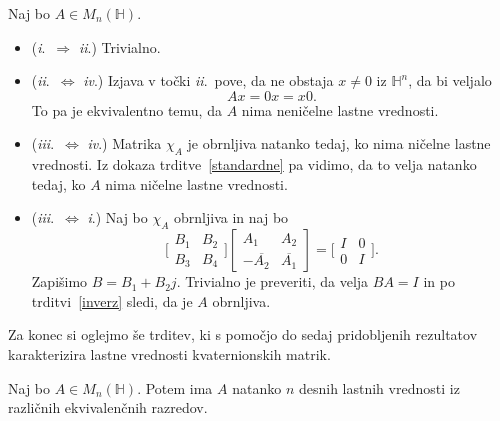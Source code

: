 \documentclass[mat1, tisk]{fmfdelo}
\numberwithin{equation}{section}
\begin{document}
\begin{dokaz}
Naj bo $A \in M_{n}(\mathbb{H})$. 
\begin{itemize}
    \item (\textit{i}.\ $\Rightarrow$ \textit{ii}.) Trivialno.
    \item (\textit{ii}.\ $\Leftrightarrow$ \textit{iv}.) Izjava v točki \textit{ii}.\ pove, da ne obstaja $x \neq 0$ iz $\mathbb{H}^{n}$, da bi veljalo
    $$Ax = 0x = x0.$$
    To pa je ekvivalentno temu, da $A$ nima neničelne lastne vrednosti. 
    \item (\textit{iii}.\ $\Leftrightarrow$ \textit{iv}.) Matrika $\chi_{A}$ je obrnljiva natanko tedaj, ko nima ničelne lastne vrednosti. Iz dokaza 
    trditve~\ref{standardne} pa vidimo, da to velja natanko tedaj, ko $A$ nima ničelne lastne vrednosti.
    \item (\textit{iii}.\ $\Leftrightarrow$ \textit{i}.) Naj bo $\chi_{A}$ obrnljiva in naj bo
    \begin{equation*}
        \Bigg[\begin{matrix}
            B_{1} & B_{2} \\
            B_{3} & B_{4}
        \end{matrix}\Bigg]
        \begin{bmatrix}
            A_{1} & A_{2} \\
            - \overline{A_{2}} & \overline{A_{1}}
        \end{bmatrix}
        =
        \Bigg[\begin{matrix}
        I & 0 \\
        0 & I
        \end{matrix}\Bigg].
    \end{equation*}
    Zapišimo $B = B_{1} + B_{2}j$. Trivialno je preveriti, da velja $BA = I$ in po trditvi~\ref{inverz} sledi, da je 
    $A$ obrnljiva.
\end{itemize} 
\end{dokaz}

Za konec si oglejmo še trditev, ki s pomočjo do sedaj pridobljenih rezultatov karakterizira lastne vrednosti kvaternionskih matrik.

\begin{trditev}
    Naj bo $A \in M_n(\mathbb{H})$. Potem ima $A$ natanko $n$ desnih lastnih vrednosti iz različnih ekvivalenčnih razredov.
\end{trditev}
\end{document}
